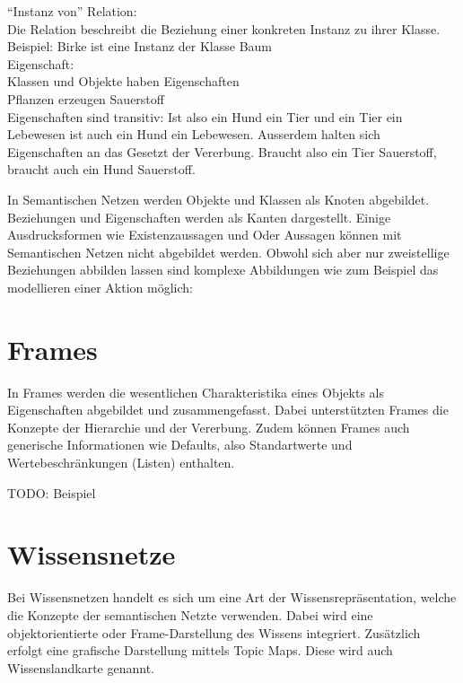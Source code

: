 "`Instanz von"' Relation:\\
\noindent\hspace*{15mm} Die Relation beschreibt die Beziehung einer konkreten Instanz zu ihrer Klasse.\\
\noindent\hspace*{15mm} Beispiel: Birke ist eine Instanz der Klasse Baum\\

Eigenschaft:\\
\noindent\hspace*{15mm} Klassen und Objekte haben Eigenschaften\\
\noindent\hspace*{15mm} Pflanzen erzeugen Sauerstoff\\
Eigenschaften sind transitiv: Ist also ein Hund ein Tier und ein Tier ein Lebewesen ist auch ein Hund ein Lebewesen. Ausserdem halten sich Eigenschaften an das Gesetzt der Vererbung. Braucht also ein Tier Sauerstoff, braucht auch ein Hund Sauerstoff.

In Semantischen Netzen werden Objekte und Klassen als Knoten abgebildet. Beziehungen und Eigenschaften werden als Kanten dargestellt.
Einige Ausdrucksformen wie Existenzaussagen und Oder Aussagen können mit Semantischen Netzen nicht abgebildet werden. Obwohl sich aber nur zweistellige Beziehungen abbilden lassen sind komplexe Abbildungen wie zum Beispiel das modellieren einer Aktion möglich:

\section{Frames}
\label{sec:wissensrepFormen_frames}

In Frames werden die wesentlichen Charakteristika eines Objekts als Eigenschaften abgebildet und zusammengefasst. Dabei unterstützten Frames die Konzepte der Hierarchie und der Vererbung. Zudem können Frames auch generische Informationen wie Defaults, also Standartwerte und Wertebeschränkungen (Listen) enthalten.

TODO: Beispiel

\section{Wissensnetze}
\label{sec:wissensrepFormen_Wissensnetze}
Bei Wissensnetzen handelt es sich um eine Art der Wissensrepräsentation, welche die Konzepte der semantischen Netzte verwenden. Dabei wird eine objektorientierte oder Frame-Darstellung des Wissens integriert. Zusätzlich erfolgt eine grafische Darstellung mittels Topic Maps. Diese wird auch Wissenslandkarte genannt. 

